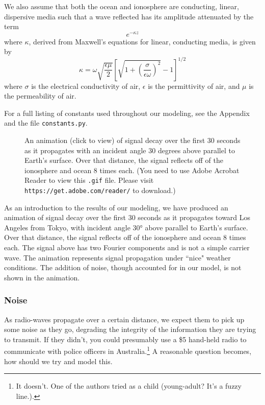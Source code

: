 \documentclass[11pt]{article}
\numberwithin{equation}{section}
\begin{document}
\par We also assume that both the ocean and ionosphere are conducting, linear, dispersive media such that a wave reflected has its amplitude attenuated by the term
\[
e^{-\kappa z}
\]
where $\kappa$, derived from Maxwell's equations for linear, conducting media\cite{griffiths2005introduction}, is given by
\begin{equation}
\kappa = \omega \sqrt{\frac{\epsilon\mu}{2}}\left[ \sqrt{1 + \left( \frac{\sigma}{\epsilon\omega} \right)^2} - 1 \right]^{1/2}
\end{equation}
where $\sigma$ is the electrical conductivity of air, $\epsilon$ is the permittivity of air, and $\mu$ is the permeability of air.
\par For a full listing of constants used throughout our modeling, see the Appendix and the file \verb|constants.py|.

 \begin{figure}[ht]
     \begin{center}
     \end{center}
     \caption{An animation (click to view) of signal decay over the first 30 seconds as it propagates with an incident angle 30 degrees above parallel to Earth’s surface. Over that distance, the signal reflects off of the ionosphere and ocean 8 times each. (You need to use Adobe Acrobat Reader to view this \texttt{.gif} file. Please visit \texttt{https://get.adobe.com/reader/} to download.)}
 \end{figure}
 
As an introduction to the results of our modeling, we have produced an animation of signal decay over the first 30 seconds as it propagates toward Los Angeles from Tokyo, with incident angle 30\si{\degree} above parallel to Earth's surface. Over that distance, the signal reflects off of the ionosphere and ocean 8 times each. The signal above has two Fourier components and is not a simple carrier wave. The animation represents signal propagation under ``nice" weather conditions. The addition of noise, though accounted for in our model, is not shown in the animation. 

\subsubsection{Noise} %
\label{ssub:noise}

As radio-waves propagate over a certain distance, we expect them to pick up some noise as they go, degrading the integrity of the information they are trying to transmit. If they didn't, you could presumably use a \$5 hand-held radio to communicate with police officers in Australia.\footnote{It doesn't. One of the authors tried as a child (young-adult? It's a fuzzy line.).} A reasonable question becomes, how should we try and model this.
\end{document}
